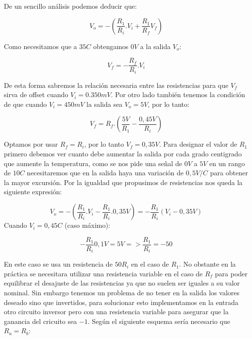 De un sencillo análisis podemos deducir que:

\begin{equation}
    V_o = -(\frac{R_1}{R_i}.V_i + \frac{R_1}{R_f} V_f)
\end{equation}

Como necesitamos que a $35$\degree$C$ obtengamos $0V$ a la salida $V_o$:

\begin{equation}
    V_f = -\frac{R_f}{R_i} .V_i
\end{equation}

De esta forma sabremos la relación necesaria entre las resistencias para que $V_f$ sirva de offset cuando $V_i=0.350mV$. Por otro lado también tenemos la condición de que cuando $V_i=450mV$ la salida sea $V_o = 5V$, por lo tanto:

\begin{equation}
    V_f = R_f . (\frac{5V}{R_1} - \frac{0,45V}{R_i})
\end{equation}

Optamos por usar $R_f = R_i$, por lo tanto $V_f=0,35V$. Para designar el valor de $R_1$ primero debemos ver cuanto debe aumentar la salida por cada grado centigrado que aumente la temperatura, como se nos pide una señal de $0V$ a $5V$ en un rango de $10$\degree$C$ necesitaremos que en la salida haya una variación de $0,5V/$\degree$C$ para obtener la mayor excursión. Por la igualdad que propusimos de resistencias nos queda la siguiente expresión:

\begin{equation}
    V_o = -( \frac{R_1}{R_i} . V_i - \frac{R_1}{R_i}.0,35V ) = -\frac{R_1}{R_i} (V_i-0,35V)
\end{equation}
Cuando $V_i = 0,45$\degree$C$ (caso máximo):

\begin{equation}
    -\frac{R_1}{R_i} 0,1V = 5V => \frac{R_1}{R_i}=-50
\end{equation}

En este caso se usa un resistencia de $50R_i$ en el caso de $R_1$. No obstante en la práctica se necesitara utilizar una resistencia variable en el caso de $R_f$ para poder equilibrar el desajuste de las resistencias ya que no suelen ser iguales a su valor nominal.
Sin embargo tenemos un problema de no tener en la salida los valores deseado sino que invertidos, para solucionar esto implementamos en la entrada otro circuito inversor pero con una resistencia variable para asegurar que la ganancia del cricuito sea $-1$. Según el siguiente esquema sería necesario que $R_a = R_b$:

